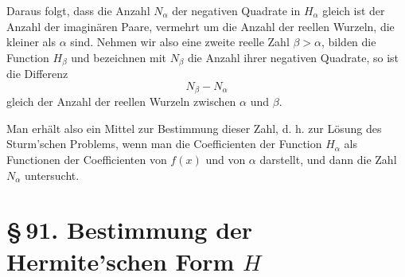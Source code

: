 \documentclass[11pt]{article}
\providecommand{\sect}[2]{\section*{\S\,#1. #2}}
\begin{document}
Daraus folgt, dass die Anzahl $N_\alpha$ der negativen Quadrate in $H_\alpha$ gleich ist der Anzahl der imaginären Paare, vermehrt um die Anzahl der reellen Wurzeln, die kleiner als $\alpha$ sind. Nehmen wir also eine zweite reelle Zahl $\beta>\alpha$, bilden die Function $H_\beta$ und bezeichnen mit $N_\beta$ die Anzahl ihrer negativen Quadrate, so ist die Differenz
\[
        N_\beta-N_\alpha
\]
gleich der Anzahl der reellen Wurzeln zwischen $\alpha$ und $\beta$.

Man erhält also ein Mittel zur Bestimmung dieser Zahl, d. h. zur Lösung des Sturm'schen Problems, wenn man die Coefficienten der Function $H_\alpha$ als Functionen der Coefficienten von $f(x)$ und von $\alpha$ darstellt, und dann die Zahl $N_\alpha$ untersucht.

\sect{91}{Bestimmung der Hermite'schen Form $H$}
\end{document}
